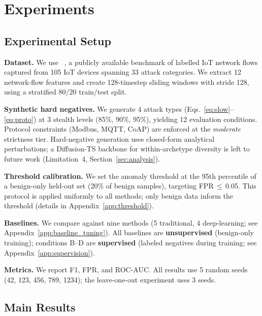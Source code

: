 \section{Experiments}
\label{sec:experiments}

\subsection{Experimental Setup}
\label{sec:experiments:setup}

\textbf{Dataset.}
We use \dataset{}~\cite{neto2023ciciot}, a publicly available benchmark
of labelled IoT network flows captured from 105 IoT devices spanning
33 attack categories.  We extract 12 network-flow features and create
128-timestep sliding windows with stride 128, using a stratified 80/20
train/test split.

\textbf{Synthetic hard negatives.}
We generate 4 attack types (Eqs.~\ref{eq:slow}--\ref{eq:proto})
at 3 stealth levels (85\%, 90\%, 95\%), yielding 12 evaluation
conditions.  Protocol constraints (Modbus, MQTT, CoAP) are enforced
at the \emph{moderate} strictness tier.
Hard-negative generation uses closed-form analytical perturbations;
a Diffusion-TS backbone for within-archetype diversity is left to future
work (Limitation~4, Section~\ref{sec:analysis}).

\textbf{Threshold calibration.}
We set the anomaly threshold at the 95th percentile of a benign-only
held-out set (20\% of benign samples), targeting FPR\,$\leq$\,0.05.
This protocol is applied uniformly to all methods; only benign data
inform the threshold (details in Appendix~\ref{app:threshold}).

\textbf{Baselines.}
We compare against nine methods (5 traditional, 4 deep-learning; see
Appendix~\ref{app:baseline_tuning}).
All baselines are \textbf{unsupervised} (benign-only training);
\ours{} conditions B--D are \textbf{supervised} (labeled negatives
during training; see Appendix~\ref{app:supervision}).

\textbf{Metrics.}
We report F1, FPR, and ROC-AUC.  All results use 5 random seeds
(42, 123, 456, 789, 1234); the leave-one-out experiment uses 3 seeds.

\subsection{Main Results}
\label{sec:experiments:main}

